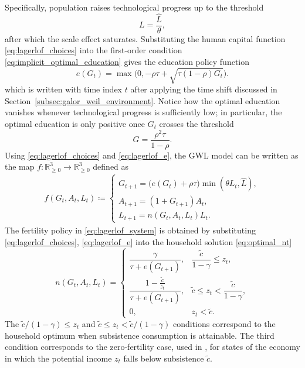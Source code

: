 \documentclass[a4paper,fleqn]{cas-sc}
\begin{document}
Specifically, population raises technological progress up to the threshold 
%
\begin{equation}\label{eq:population_threshold} 
    L = \frac{\hat L}{\theta}, 
\end{equation} 
%
after which the scale effect saturates. 
Substituting the human capital function \eqref{eq:lagerlof_choices} into the first-order condition \eqref{eq:implicit_optimal_education} gives the education policy function 
%
\begin{equation}\label{eq:lagerlof_e} 
    e(G_t) = \max\!\Big(0,-\rho\tau+\sqrt{\tau(1-\rho)G_t}\Big). 
\end{equation} 
%
which is written with time index $t$ after applying the time shift discussed in Section~\ref{subsec:galor_weil_environment}.
Notice how the optimal education vanishes whenever technological progress is sufficiently low; in particular, the optimal education is only positive once $G_t$ crosses the threshold
%
\begin{equation}\label{eq:education_threshold} 
    G = \frac{\rho^2\tau}{1-\rho}. 
\end{equation} 
%
Using \eqref{eq:lagerlof_choices} and \eqref{eq:lagerlof_e}, the GWL model can be written as the map $f:\mathbb R_{\geq0}^3\to\mathbb R_{\geq0}^3$ defined as
%
\begin{align}\label{eq:lagerlof_system} 
    f(G_t,A_t,L_t)\coloneqq
    \begin{cases} 
        G_{t+1} = \big(e(G_t)+\rho\tau\big)\min(\theta L_t,\hat L), \\
        A_{t+1} = (1+G_{t+1})A_t, \\
        L_{t+1} = n(G_t,A_t,L_t)L_t. 
    \end{cases} 
\end{align} 
%
The fertility policy in \eqref{eq:lagerlof_system} is obtained by substituting \eqref{eq:lagerlof_choices}, \eqref{eq:lagerlof_e} into the household solution \eqref{eq:optimal_nt}
%
\begin{equation}\label{eq:lagerlof_optimum} 
    n(G_t,A_t,L_t) = \begin{cases} 
                        \dfrac{\gamma}{\tau+e(G_{t+1})}, & \dfrac{\tilde c}{1-\gamma}\leq z_t, \\[10pt] \dfrac{1-\frac{\tilde c}{z_t}}{\tau+e(G_{t+1})}, & \tilde c\leq z_t<\dfrac{\tilde c}{1-\gamma}, \\[10pt] 0, & z_t<\tilde c. 
                     \end{cases} 
\end{equation}
%
The $\tilde{c}/(1-\gamma)\leq z_t$ and $\tilde{c}\leq z_t < \tilde{c}/(1-\gamma)$ conditions correspond to the household optimum when subsistence consumption is attainable. 
The third condition corresponds to the zero-fertility case, used in \citet{Lagerlof2006}, for states of the economy in which the potential income $z_t$ falls below subsistence $\tilde{c}$. 
\end{document}

